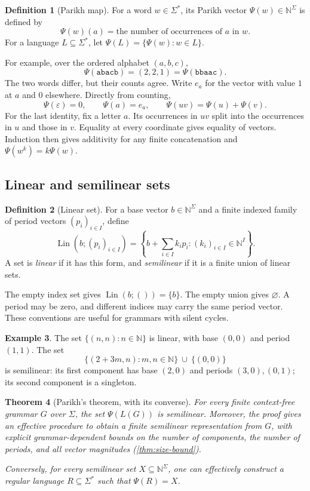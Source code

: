 \documentclass[11pt,a4paper]{article}
\numberwithin{equation}{section}
\theoremstyle{plain}
\newtheorem{theorem}{Theorem}[section]
\theoremstyle{definition}
\newtheorem{definition}[theorem]{Definition}
\newtheorem{example}[theorem]{Example}
\theoremstyle{remark}
\newcommand{\N}{\mathbb N}
\newcommand{\eps}{\varepsilon}
\newcommand{\Lin}{\operatorname{Lin}}
\begin{document}
\begin{definition}[Parikh map]
For a word $w\in\Sigma^*$, its Parikh vector $\Psi(w)\in\N^\Sigma$ is defined by
\[
\Psi(w)(a)=\text{the number of occurrences of $a$ in $w$}.
\]
For a language $L\subseteq\Sigma^*$, let $\Psi(L)=\{\Psi(w):w\in L\}$.
\end{definition}

For example, over the ordered alphabet $(a,b,c)$,
\[
\Psi(\texttt{abacb})=(2,2,1)=\Psi(\texttt{bbaac}).
\]
The two words differ, but their counts agree. Write $e_a$ for the vector with value $1$ at $a$ and $0$ elsewhere. Directly from counting,
\begin{equation}\label{eq:word-add}
\Psi(\eps)=0,\qquad \Psi(a)=e_a,\qquad
\Psi(uv)=\Psi(u)+\Psi(v).
\end{equation}
For the last identity, fix a letter $a$. Its occurrences in $uv$ split into the occurrences in $u$ and those in $v$. Equality at every coordinate gives equality of vectors. Induction then gives additivity for any finite concatenation and $\Psi(w^k)=k\Psi(w)$.

\subsection{Linear and semilinear sets}
\begin{definition}[Linear set]
For a base vector $b\in\N^\Sigma$ and a finite indexed family of period vectors $(p_i)_{i\in I}$, define
\[
\Lin(b;(p_i)_{i\in I})
=\left\{b+\sum_{i\in I}k_i p_i : (k_i)_{i\in I}\in\N^I\right\}.
\]
A set is \emph{linear} if it has this form, and \emph{semilinear} if it is a finite union of linear sets.
\end{definition}

The empty index set gives $\Lin(b;())=\{b\}$. The empty union gives $\varnothing$. A period may be zero, and different indices may carry the same period vector. These conventions are useful for grammars with silent cycles.

\begin{example}
The set $\{(n,n):n\in\N\}$ is linear, with base $(0,0)$ and period $(1,1)$. The set
\[
\{(2+3m,n):m,n\in\N\}\ \cup\ \{(0,0)\}
\]
is semilinear: its first component has base $(2,0)$ and periods $(3,0),(0,1)$; its second component is a singleton.
\end{example}

\begin{theorem}[Parikh's theorem, with its converse]\label{thm:parikh-statement}
For every finite context-free grammar $G$ over $\Sigma$, the set $\Psi(L(G))$ is semilinear. Moreover, the proof gives an effective procedure to obtain a finite semilinear representation from $G$, with explicit grammar-dependent bounds on the number of components, the number of periods, and all vector magnitudes (\cref{thm:size-bound}).

Conversely, for every semilinear set $X\subseteq\N^\Sigma$, one can effectively construct a regular language $R\subseteq\Sigma^*$ such that $\Psi(R)=X$.
\end{theorem}
\end{document}
